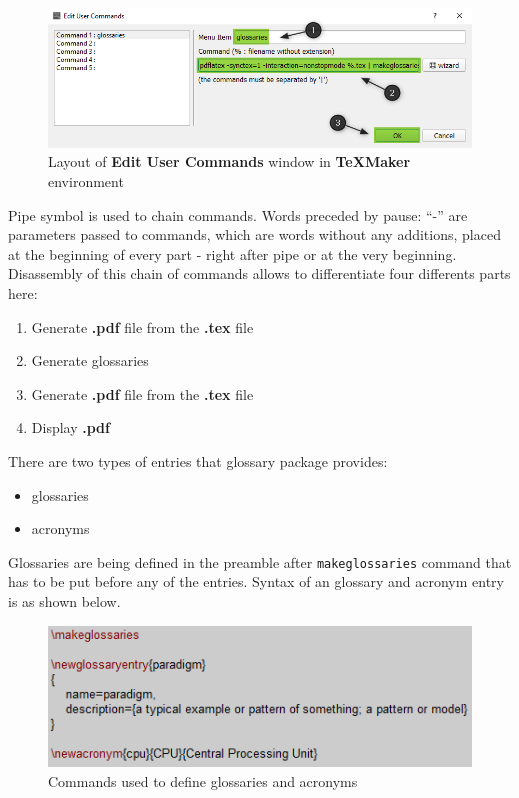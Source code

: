 \begin{figure}[H]
\centering
\includegraphics[scale=0.6]{LaTeX/figures/custom_command_marked.png}
\caption{Layout of \textbf{Edit User Commands} window in \textbf{TeXMaker} environment}
\end{figure}

Pipe symbol is used to chain commands. Words preceded by pause: ``-'' are parameters passed to commands, which are words without any additions, placed at the beginning of every part - right after pipe or at the very beginning. Disassembly of this chain of commands allows to differentiate four differents parts here:
\begin{enumerate}
\item Generate \textbf{.pdf} file from the \textbf{.tex} file
\item Generate glossaries
\item Generate \textbf{.pdf} file from the \textbf{.tex} file
\item Display \textbf{.pdf}
\end{enumerate}

There are two types of entries that glossary package provides:
\begin{itemize}
\item glossaries
\item acronyms
\end{itemize}

Glossaries are being defined in the preamble after \texttt{\bs makeglossaries} command that has to be put before any of the entries. Syntax of an glossary and acronym entry is as shown below.

\begin{figure}[H]
\centering
\includegraphics[scale=1.0]{LaTeX/figures/glossary_definition.png}
\caption{Commands used to define glossaries and acronyms}
\label{fig:glossary_definition}
\end{figure}

